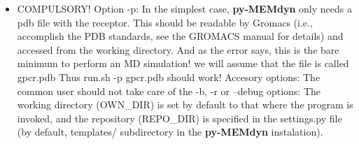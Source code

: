\documentclass[10pt, oneside, pdftex]{article}
\begin{document}
\begin{itemize}
\item{COMPULSORY! Option -p:  In the simplest case, \textbf{py-MEMdyn}
  only needs a pdb file with the receptor.  This should be readable by
  Gromacs (i.e., accomplish the  PDB standards, see the GROMACS manual
  for details)  and accessed  from the working  directory. And  as the
  error says, this is the bare minimum to perform an MD simulation! we
  will assume that the file is called gpcr.pdb Thus run.sh -p gpcr.pdb
  should work!  Accesory options: The common user should not take care
  of the -b,  -r or --debug options: The  working directory (OWN\_DIR)
  is set  by default  to that  where the program  is invoked,  and the
  repository  (REPO\_DIR) is  specified  in the  settings.py file  (by
  default,   templates/   subdirectory   in   the   \textbf{py-MEMdyn}
  instalation).}
  

\end{itemize}
\end{document}
